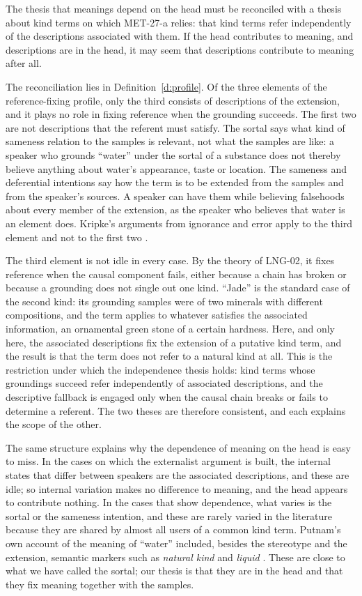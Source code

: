 \documentclass{situationist-preprint}
\begin{document}
The thesis that meanings depend on the head must be reconciled with a thesis about kind terms on which MET-27-a relies: that kind terms refer independently of the descriptions associated with them. If the head contributes to meaning, and descriptions are in the head, it may seem that descriptions contribute to meaning after all.

The reconciliation lies in Definition~\ref{d:profile}. Of the three elements of the reference-fixing profile, only the third consists of descriptions of the extension, and it plays no role in fixing reference when the grounding succeeds. The first two are not descriptions that the referent must satisfy. The sortal says what kind of sameness relation to the samples is relevant, not what the samples are like: a speaker who grounds \enquote{water} under the sortal of a substance does not thereby believe anything about water's appearance, taste or location. The sameness and deferential intentions say how the term is to be extended from the samples and from the speaker's sources. A speaker can have them while believing falsehoods about every member of the extension, as the speaker who believes that water is an element does. Kripke's arguments from ignorance and error apply to the third element and not to the first two \citep{Kripke1980}.

The third element is not idle in every case. By the theory of LNG-02, it fixes reference when the causal component fails, either because a chain has broken or because a grounding does not single out one kind. \enquote{Jade} is the standard case of the second kind: its grounding samples were of two minerals with different compositions, and the term applies to whatever satisfies the associated information, an ornamental green stone of a certain hardness. Here, and only here, the associated descriptions fix the extension of a putative kind term, and the result is that the term does not refer to a natural kind at all. This is the restriction under which the independence thesis holds: kind terms whose groundings succeed refer independently of associated descriptions, and the descriptive fallback is engaged only when the causal chain breaks or fails to determine a referent. The two theses are therefore consistent, and each explains the scope of the other.

The same structure explains why the dependence of meaning on the head is easy to miss. In the cases on which the externalist argument is built, the internal states that differ between speakers are the associated descriptions, and these are idle; so internal variation makes no difference to meaning, and the head appears to contribute nothing. In the cases that show dependence, what varies is the sortal or the sameness intention, and these are rarely varied in the literature because they are shared by almost all users of a common kind term. Putnam's own account of the meaning of \enquote{water} included, besides the stereotype and the extension, semantic markers such as \emph{natural kind} and \emph{liquid} \citep{Putnam1975}. These are close to what we have called the sortal; our thesis is that they are in the head and that they fix meaning together with the samples.
\end{document}
